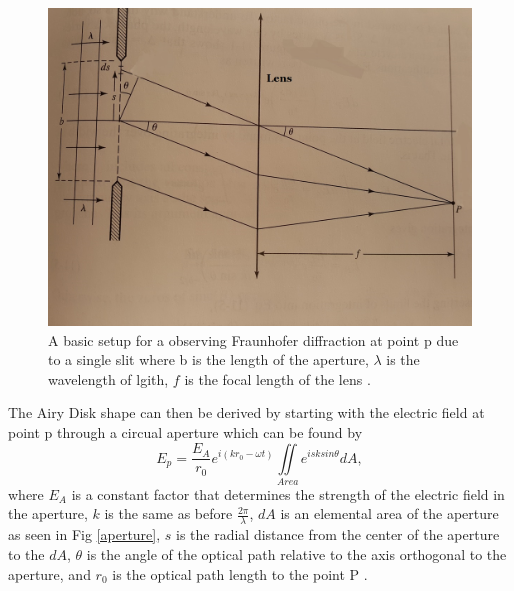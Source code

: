\documentclass[ notitlepage, numerical, 11pt]{revtex4-1} %
\begin{document}
\begin{figure}[H]
\centerline{\includegraphics[scale=.2]{fraunD.jpg}}
\caption{A basic setup for a observing Fraunhofer diffraction at point p due to a single slit where b is the length of the aperture, $\lambda$ is the wavelength of lgith, $f$ is the focal length of the lens \cite{optics}.}
\label{fraunD}
\end{figure} The Airy Disk shape can then be derived by starting with the electric field at point p through a circual aperture which can be found by 
\begin{equation}
E_p = \frac{E_A}{r_0}e^{i(k r_0 -\omega t)}\iint \limits_{Area} e^{i s k sin\theta} dA,
\label{EP}
\end{equation}
where $E_A$ is a constant factor that determines the strength of the electric field in the aperture, $k$ is the same as before $\frac{2\pi}{\lambda}$, $dA$ is an elemental area of the aperture as seen in Fig \ref{aperture}, $s$ is the radial distance from the center of the aperture to the $dA$, $\theta$ is the angle of the optical path relative to the axis orthogonal to the aperture, and $r_0$ is the optical path length to the point P \cite{optics}. 
\end{document}
